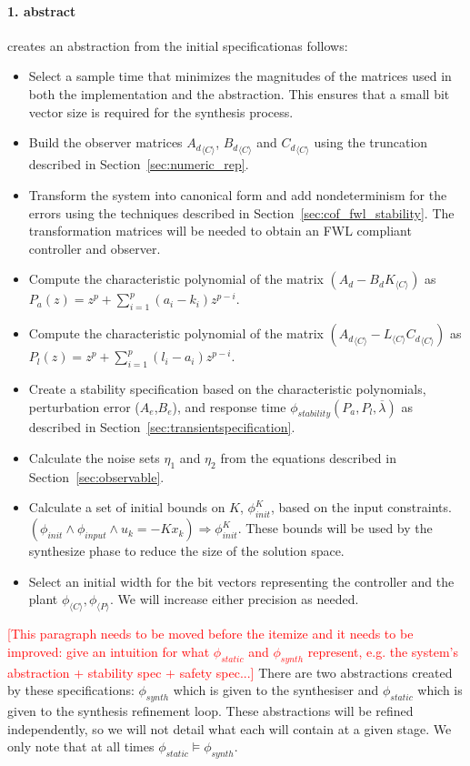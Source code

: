 \documentclass[sigconf]{llncs}
\newcommand{\mat}[1]{{#1}}
\renewcommand{\vec}[1]{{#1}}
\renewcommand{\note}[1]{\textcolor{red}{[#1]}}
\begin{document}
\paragraph{1. {\sc abstract}} creates an abstraction from the initial specificationas follows:
\begin{itemize}
\item Select a sample time that minimizes the magnitudes of the matrices used in both the
implementation and the abstraction. This ensures that a small bit vector size is required for
the synthesis process.
\item Build the observer matrices ${\mat{A}_d}_{\langle C \rangle}$, ${\mat{B}_d}_{\langle C \rangle}$
and ${\mat{C}_d}_{\langle C \rangle}$ using the truncation described in Section~\ref{sec:numeric_rep}.
\item Transform the system into canonical form and add nondeterminism for the errors
using the techniques described in Section~\ref{sec:cof_fwl_stability}. The transformation
matrices will be needed to obtain an FWL compliant controller and observer.
\item Compute the characteristic polynomial of the matrix $(\mat{A}_d-\mat{B}_d\mat{K}_{\langle C \rangle})$
as $P_a(z) = z^p+\sum_{i=1}^p{(a_i-k_i)z^{p-i}}$. 
\item Compute the characteristic polynomial of the matrix $({\mat{A}_d}_{\langle C \rangle}-\mat{L}_{\langle C \rangle}{\mat{C}_d}_{\langle C \rangle})$
as $P_l(z) = z^p+\sum_{i=1}^p{(l_i-a_i)z^{p-i}}$. 
\item Create a stability specification based on the characteristic polynomials, perturbation
error ($\mat{A}_e$,$\mat{B}_e$), and response time $\phi_{stability}(P_a,P_l,\overline{\lambda})$
as described in Section~\ref{sec:transientspecification}.
\item Calculate the noise sets $\eta_1$ and $\eta_2$ from the equations
described in Section~\ref{sec:observable}.
\item Calculate a set of initial bounds on $\mat{K}$, $\phi_\mathit{init}^{K}$,
based on the input constraints.
$(\phi_\mathit{init} \wedge \phi_\mathit{input} \wedge u_k=-\mat{K} \vec{x}_k)
\Rightarrow \phi_\mathit{init}^{K}$.
These bounds will be used by the {\sc synthesize} phase to reduce the size of the solution space. 
\item Select an initial width for the bit vectors representing the controller and the plant $\phi_{\langle C \rangle}, \phi_{\langle P \rangle}$. We will increase either precision as needed.
\end{itemize}
\note{This paragraph needs to be moved before the itemize and it needs to be improved: give an intuition for what $\phi_{static}$ and $\phi_{synth}$ represent, e.g. the system's abstraction + stability spec + safety spec...}
There are two abstractions created by these specifications: $\phi_{synth}$ which is given to the synthesiser and $\phi_{static}$ which is given to the synthesis refinement loop. These abstractions will be refined independently, so we will not detail what each will contain at a given stage. We only note that at all times $\phi_{static} \models \phi_{synth}$.
%
\end{document}
